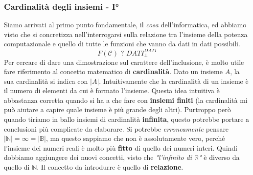 \documentclass{article}
\begin{document}
\subsubsection{Cardinalità degli insiemi - I°}
Siamo arrivati al primo punto fondamentale, il \textit{cosa} dell'informatica, ed
abbiamo visto che si concretizza nell'interrogarsi sulla relazione tra l'insieme della
potenza computazionale e quello di tutte le funzioni che vanno da dati in dati possibili.
$$F(\mathcal{C})\text{ ? }DATI_{\bot}^{DATI}$$
\newline\newline
Per cercare di dare una dimostrazione sul carattere dell'inclusione, è molto utile
fare riferimento al concetto matematico di \textbf{cardinalità}.
\newline\newline
Dato un insieme $A$, la sua cardinalità si indica con $|A|$. Intuitivamente che la cardinalità
di un insieme è il numero di elementi da cui è formato l'insieme. Questa idea intuitiva
è abbastanza corretta quando si ha a che fare con \textbf{insiemi finiti} (la cardinalità mi può
aiutare a capire quale insieme è più grande degli altri).
\newline\newline
Purtroppo però quando tiriamo in ballo insiemi di cardinalità \textbf{infinita}, questo potrebbe
portare a conclusioni più complicate da elaborare. Si potrebbe \textit{erroneamente}
pensare $|\mathbb{N}|=\infty=|\mathbb{B}|$, ma questo sappiamo che
non è assolutamente vero, perché l'insieme dei numeri reali è molto più \textbf{fitto}
di quello dei numeri interi.
\newline\newline
Quindi dobbiamo aggiungere dei nuovi concetti, visto che \textit{"l'infinito di $\mathbb{R}$"} è
diverso da quello di $\mathbb{N}$. Il concetto da introdurre è quello di \textbf{relazione}.
\end{document}
